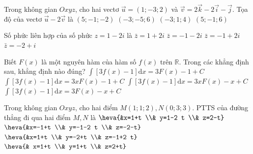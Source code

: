 \begin{ex}%
	Trong không gian $Oxyz$, cho hai vectơ $\vec{u}=(1 ;-3 ; 2)$ và $\vec{v}=2 \vec{k}-2 \vec{i}-\vec{j}$. Tọa độ của vectơ $\vec{u}-2\vec{v}$ là
	\choice
	{\True $(5 ;-1 ;-2)$}
	{ $(-3 ;-5 ; 6)$}
	{ $(-3 ; 1 ; 4)$}
	{ $(5 ;-1 ; 6)$}
\end{ex}

\begin{ex}%
	Số phức liên hợp của số phức $z=1-2i$ là
	\choice
	{\True $\bar{z}=1+2 i$}
	{ $\bar{z}=-1-2 i$}
	{ $\bar{z}=-1+2 i$}
	{ $\bar{z}=-2+i$}
\end{ex}

\begin{ex}%
	Biết $F(x)$ là một nguyên hàm của hàm số $f(x)$ trên $\mathbb{R}$. Trong các khẳng định sau, khẳng định nào đúng?
	\choice
	{ $\displaystyle\int\limits[3f(x)-1] \mathrm{d}x=3F(x)-1+C$}
	{ $\displaystyle\int\limits[3f(x)-1] \mathrm{d}x=3xF(x)-1+C$}
	{ $\displaystyle\int\limits[3f(x)-1] \mathrm{d}x=3xF(x)-x+C$}
	{ \True$\displaystyle\int\limits[3f(x)-1] \mathrm{d}x=3F(x)-x+C$}
\end{ex}

\begin{ex}%
	Trong không gian $O x y z$, cho hai điểm $M(1;1;2), N(0;3;3)$. PTTS của đường thẳng đi qua hai điểm $M, N$ là
	\choice
	{\True $\heva{&x=1+t \\& y=1-2 t \\& z=2-t}$}
	{$\heva{&x=-1+t \\& y=-1-2 t \\& z=-2-t}$}
	{ $\heva{&x=1+t \\& y=-2+t \\& z=-1+2 t}$}
	{ $ \heva{& x=1+t \\& y=1+t \\& z=2+t}$}
\end{ex}

